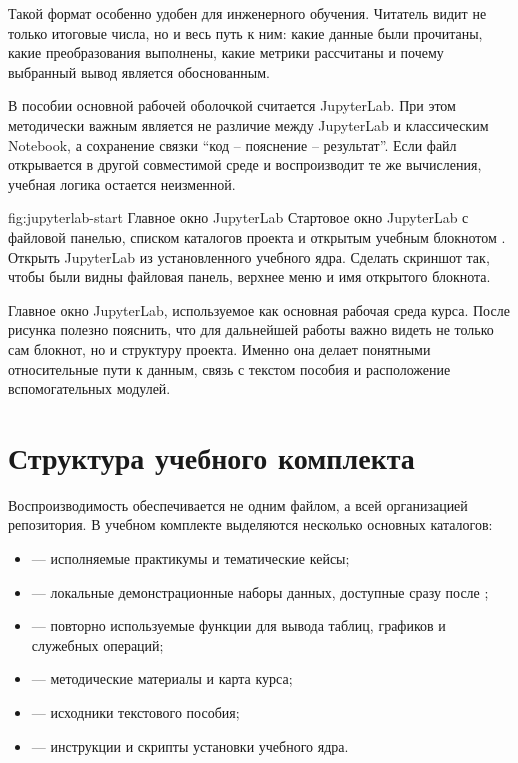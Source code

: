 Такой формат особенно удобен для инженерного обучения. Читатель видит не только итоговые числа, но и весь путь к ним: какие данные были прочитаны, какие преобразования выполнены, какие метрики рассчитаны и почему выбранный вывод является обоснованным.

В пособии основной рабочей оболочкой считается JupyterLab. При этом методически важным является не различие между JupyterLab и классическим Notebook, а сохранение связки ``код -- пояснение -- результат''. Если файл  открывается в другой совместимой среде и воспроизводит те же вычисления, учебная логика остается неизменной.

\screenshotplaceholder
  {fig:jupyterlab-start}
  {Главное окно JupyterLab}
  {Стартовое окно JupyterLab с файловой панелью, списком каталогов проекта и открытым учебным блокнотом .}
  {Открыть JupyterLab из установленного учебного ядра. Сделать скриншот так, чтобы были видны файловая панель, верхнее меню и имя открытого блокнота.}

\figureinstruction
  {Главное окно JupyterLab, используемое как основная рабочая среда курса.}
  {После рисунка полезно пояснить, что для дальнейшей работы важно видеть не только сам блокнот, но и структуру проекта. Именно она делает понятными относительные пути к данным, связь с текстом пособия и расположение вспомогательных модулей.}

\section{Структура учебного комплекта}

Воспроизводимость обеспечивается не одним файлом, а всей организацией репозитория. В учебном комплекте выделяются несколько основных каталогов:
\begin{itemize}[leftmargin=1.25cm]
\item {} --- исполняемые практикумы и тематические кейсы;
\item {} --- локальные демонстрационные наборы данных, доступные сразу после ;
\item {} --- повторно используемые функции для вывода таблиц, графиков и служебных операций;
\item {} --- методические материалы и карта курса;
\item {} --- исходники текстового пособия;
\item {} --- инструкции и скрипты установки учебного ядра.
\end{itemize}


